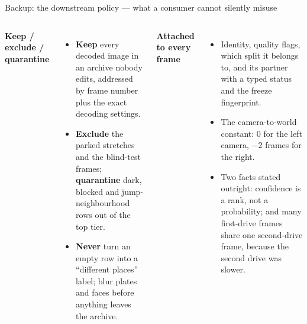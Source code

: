 \documentclass[10pt,aspectratio=169]{beamer}
\begin{document}
\begin{frame}{Backup: the downstream policy --- what a consumer cannot silently misuse}
\small
\begin{columns}[T]
\textbf{Keep / exclude / quarantine}
\begin{itemize}
  \item \textbf{Keep} every decoded image in an archive nobody edits, addressed by frame number plus the exact decoding settings.
  \item \textbf{Exclude} the parked stretches and the blind-test frames; \textbf{quarantine} dark, blocked and jump-neighbourhood rows out of the top tier.
  \item \textbf{Never} turn an empty row into a ``different places'' label; blur plates and faces before anything leaves the archive.
\end{itemize}
\textbf{Attached to every frame}
\begin{itemize}
  \item Identity, quality flags, which split it belongs to, and its partner with a typed status and the freeze fingerprint.
  \item The camera-to-world constant: 0 for the left camera, $-2$ frames for the right.
  \item Two facts stated outright: confidence is a rank, not a probability; and many first-drive frames share one second-drive frame, because the second drive was slower.
\end{itemize}
\end{columns}
\end{frame}
\end{document}
